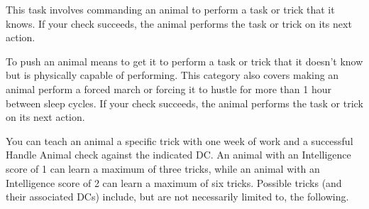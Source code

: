  This task involves commanding an animal to perform a task or trick that it knows. If your check succeeds, the animal performs the task or trick on its next action.

 To push an animal means to get it to perform a task or trick that it doesn't know but is physically capable of performing. This category also covers making an animal perform a forced march or forcing it to hustle for more than 1 hour between sleep cycles. If your check succeeds, the animal performs the task or trick on its next action.

 You can teach an animal a specific trick with one week of work and a successful Handle Animal check against the indicated DC. An animal with an Intelligence score of 1 can learn a maximum of three tricks, while an animal with an Intelligence score of 2 can learn a maximum of six tricks. Possible tricks (and their associated DCs) include, but are not necessarily limited to, the following.

